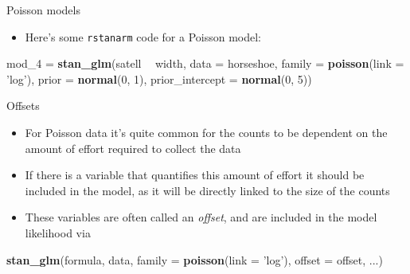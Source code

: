 \documentclass[ignorenonframetext,]{beamer}
\newenvironment{Shaded}{\begin{snugshade}}{\end{snugshade}}
\newcommand{\KeywordTok}[1]{\textcolor[rgb]{0.13,0.29,0.53}{\textbf{#1}}}
\newcommand{\DataTypeTok}[1]{\textcolor[rgb]{0.13,0.29,0.53}{#1}}
\newcommand{\DecValTok}[1]{\textcolor[rgb]{0.00,0.00,0.81}{#1}}
\newcommand{\StringTok}[1]{\textcolor[rgb]{0.31,0.60,0.02}{#1}}
\newcommand{\OperatorTok}[1]{\textcolor[rgb]{0.81,0.36,0.00}{\textbf{#1}}}
\newcommand{\NormalTok}[1]{#1}
\providecommand{\tightlist}{%
  \setlength{\itemsep}{0pt}\setlength{\parskip}{0pt}}
\begin{document}
\begin{frame}[fragile]{Poisson models}

\begin{itemize}
\tightlist
\item
  Here's some \texttt{rstanarm} code for a Poisson model:
\end{itemize}

\begin{Shaded}
\begin{Highlighting}[]
\NormalTok{mod_}\DecValTok{4}\NormalTok{ =}\StringTok{ }\KeywordTok{stan_glm}\NormalTok{(satell }\OperatorTok{~}\StringTok{ }\NormalTok{width, }
                 \DataTypeTok{data =}\NormalTok{ horseshoe,}
                 \DataTypeTok{family =} \KeywordTok{poisson}\NormalTok{(}\DataTypeTok{link =} \StringTok{'log'}\NormalTok{),}
                 \DataTypeTok{prior =} \KeywordTok{normal}\NormalTok{(}\DecValTok{0}\NormalTok{, }\DecValTok{1}\NormalTok{),}
                 \DataTypeTok{prior_intercept =} \KeywordTok{normal}\NormalTok{(}\DecValTok{0}\NormalTok{, }\DecValTok{5}\NormalTok{))}
\end{Highlighting}
\end{Shaded}

\end{frame}

\begin{frame}[fragile]{Offsets}

\begin{itemize}
\tightlist
\item
  For Poisson data it's quite common for the counts to be dependent on
  the amount of effort required to collect the data
\item
  If there is a variable that quantifies this amount of effort it should
  be included in the model, as it will be directly linked to the size of
  the counts
\item
  These variables are often called an \emph{offset}, and are included in
  the model likelihood via
\end{itemize}

\begin{Shaded}
\begin{Highlighting}[]
\KeywordTok{stan_glm}\NormalTok{(formula, data, }
         \DataTypeTok{family =} \KeywordTok{poisson}\NormalTok{(}\DataTypeTok{link =} \StringTok{'log'}\NormalTok{), }
         \DataTypeTok{offset =}\NormalTok{ offset, ...)}
\end{Highlighting}
\end{Shaded}

\end{frame}
\end{document}
